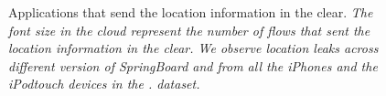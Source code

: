 \begin{figure}[tb]
\newline
{}
\caption{Applications that send the location information in the clear. \emph{The font size in the cloud represent the number of flows that sent the location information in the clear. We observe location leaks across different version of SpringBoard and from all the iPhones and the iPodtouch devices in the \mobWild. dataset.}}
\label{fig:location-wordcloud}
\end{figure}


